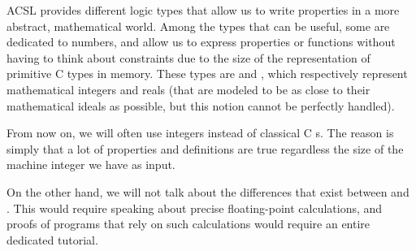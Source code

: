 ACSL provides different logic types that allow us to write properties in a more
abstract, mathematical world. Among the types that can be useful, some are
dedicated to numbers, and allow us to express properties or functions without
having to think about constraints due to the size of
the representation of primitive C types in memory. These types are
 and , which respectively represent
mathematical integers and reals (that are modeled to be as close to their
mathematical ideals as possible, but this notion cannot be perfectly handled).

From now on, we will often use integers instead of classical C
s. The reason is simply that a lot of properties and
definitions are true regardless the size of the machine integer we have
as input.

On the other hand, we will not talk about the differences that exist
between  and . This would require
speaking about precise floating-point calculations, and proofs of programs
that rely on such calculations would require an entire dedicated
tutorial.
